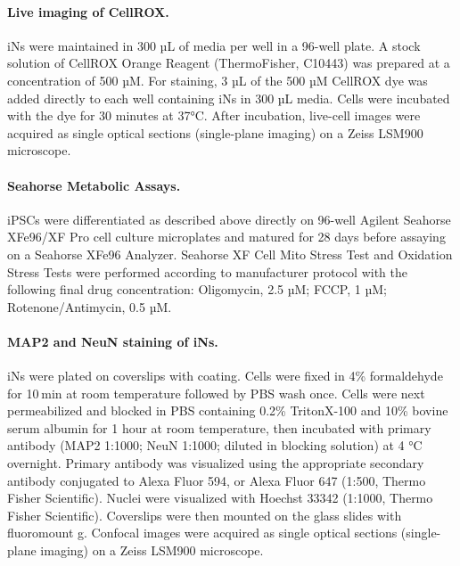 \paragraph{Live imaging of CellROX.}
iNs were maintained in 300 µL of media per well in a 96-well plate. A stock solution of CellROX Orange Reagent (ThermoFisher, C10443) was prepared at a concentration of 500 µM. For staining, 3 µL of the 500 µM CellROX dye was added directly to each well containing iNs in 300 µL media. Cells were incubated with the dye for 30 minutes at 37°C. After incubation, live-cell images were acquired as single optical sections (single-plane imaging) on a Zeiss LSM900 microscope.

\paragraph{Seahorse Metabolic Assays.}
iPSCs were differentiated as described above directly on 96-well Agilent Seahorse XFe96/XF Pro cell culture microplates and matured for 28 days before assaying on a Seahorse XFe96 Analyzer. Seahorse XF Cell Mito Stress Test and Oxidation Stress Tests were performed according to manufacturer protocol with the following final drug concentration: Oligomycin, 2.5 µM; FCCP, 1 µM; Rotenone/Antimycin, 0.5 µM. 

\paragraph{MAP2 and NeuN staining of iNs.}
iNs were plated on coverslips with coating. Cells were fixed in 4\% formaldehyde for 10 min at room temperature followed by PBS wash once. Cells were next permeabilized and blocked in PBS containing 0.2\% TritonX-100 and 10\% bovine serum albumin for 1 hour at room temperature, then incubated with primary antibody (MAP2 1:1000; NeuN 1:1000; diluted in blocking solution) at 4 °C overnight. Primary antibody was visualized using the appropriate secondary antibody conjugated to Alexa Fluor 594, or Alexa Fluor 647 (1:500, Thermo Fisher Scientific). Nuclei were visualized with Hoechst 33342 (1:1000, Thermo Fisher Scientific). Coverslips were then mounted on the glass slides with fluoromount g. Confocal images were acquired as single optical sections (single-plane imaging) on a Zeiss LSM900 microscope.

